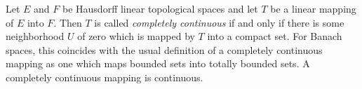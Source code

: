 Let $E$ and $F$ be Hausdorff linear topological spaces and let $T$ be a linear mapping of $E$ into $F$. Then $T$ is called \emph{completely continuous} if and only if there is some neighborhood $U$ of zero which is mapped by $T$ into a compact set. For Banach spaces, this coincides with the usual definition of a completely continuous mapping as one which maps bounded sets into totally bounded sets. A completely continuous mapping is continuous.
